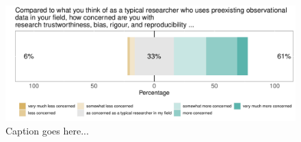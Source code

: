 \documentclass[
  man,floatsintext]{apa6}
\begin{document}
\begin{table}[H]

\caption{\label{tab:unnamed-chunk-7}What programming language or software do you use for your analyses of preexisting observational data?}
\end{table}



\begin{figure}

{\centering \includegraphics[width=1\linewidth]{manuscript_files/figure-latex/concerned-1} 

}

\caption{Caption goes here...}\label{fig:concerned}
\end{figure}
\end{document}
